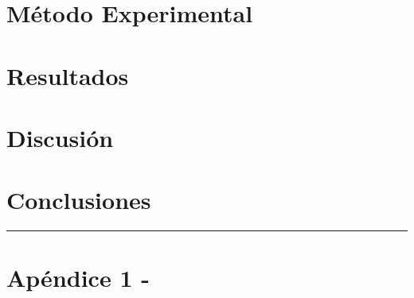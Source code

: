 \documentclass[11pt,a4paper]{article}
\begin{document}
\begin{multicols}{2}
\section{Método Experimental}

\section{Resultados}


\section{Discusión}

\section{Conclusiones}




\end{multicols}
\newpage
\begin{appendices}
\vspace{-1em}
\hrule
\vspace{1em}
\normalsize
\section{Apéndice 1 -}
\end{appendices}

\begin{multicols}{2}

\end{multicols}
\end{document}
